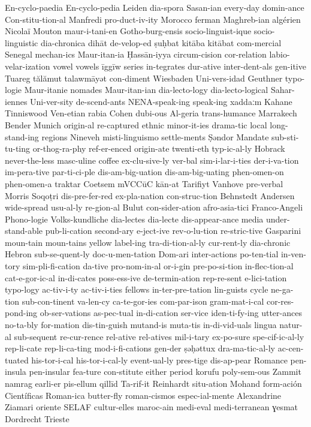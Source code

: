 {En-cyclo-paedia
En-cyclo-pedia
Leiden
dia-spora
Sasan-ian
every-day
domin-ance
Con-stitu-tion-al
Manfredi
pro-duct-iv-ity
Morocco
ferman
Maghreb-ian
algérien
Nicolaï
Mouton
maur-i-tani-en
Gotho-burg-ensis
socio-linguist-ique
socio-linguistic
dia-chronica
dihāt
de-velop-ed
ṣuḥbat
kitāba
kitābat
com-mercial
Senegal
mechan-ics
Maur-itan-ia
Ḥassān-iyya
circum-cision
cor-relation
labio-velar-ization
vowel
vowels
īggīw
series
in-tegrates
dur-ative
inter-dent-als
gen-itive
Tuareg
tălămut
talawmāyət
con-diment
Wiesbaden
Uni-vers-idad
Geuthner
typo-logie
Maur-itanie
nomades
Maur-itan-ian
dia-lecto-logy
dia-lecto-logical
Sahar-iennes
Uni-ver-sity
de-scend-ants
NENA-speak-ing
speak-ing
xaddaːm
Kahane
Tinniswood
Ven-etian
rabia
Cohen
dubi-ous
Al-geria
trans-humance
Marrakech
Bender
Munich
origin-al
re-captured
ethnic
minor-it-ies
drama-tic
local
long-stand-ing
regions
Nineveh
misti-linguismo
settle-ments
Ṣəndor
Mandate
sub-sti-tu-ting
or-thog-ra-phy
ref-er-enced
origin-ate
twenti-eth
typ-ic-al-ly
Hobrack
never-the-less
masc-uline
coffee
ex-clu-sive-ly
ver-bal
sim-i-lar-i-ties
der-i-va-tion
im-pera-tive
par-ti-ci-ple
dis-am-big-uation
dis-am-big-uating
phen-omen-on
phen-omen-a
traktar
Coetsem
mVCCūC
kān-at
Tarifiyt
Vanhove
pre-verbal
Morris
Soqoṭri
dis-pre-fer-red
ex-pla-nation
con-struc-tion
Behnstedt
Andersen
wide-spread
usu-al-ly
re-gion-al
Bulut
con-sider-ation
afro-asia-tici
Franco-Angeli
Phono-logie
Volks-kundliche
dia-lectes
dia-lecte
dis-appear-ance
media
under-stand-able
pub-li-cation
second-ary
e-ject-ive
rev-o-lu-tion
re-stric-tive
Gasparini
moun-tain
moun-tains
yellow
label-ing
tra-di-tion-al-ly
cur-rent-ly
dia-chronic
Hebron
sub-se-quent-ly
doc-u-men-tation
Dom-ari
inter-actions
po-ten-tial
in-ven-tory
sim-pli-fi-cation
da-tive
pro-nom-in-al
or-i-gin
pre-po-si-tion
in-flec-tion-al
cat-e-gor-ic-al
in-di-cates
poss-ess-ive
de-termin-ation
rep-re-sent
e-lici-tation
typo-logy
ac-tiv-i-ty
ac-tiv-i-ties
fellows
in-ter-pre-tation
lin-guists
cycle
ne-ga-tion
sub-con-tinent
va-len-cy
ca-te-gor-ies
com-par-ison
gram-mat-i-cal
cor-res-pond-ing
ob-ser-vations
as-pec-tual
in-di-cation
ser-vice
iden-ti-fy-ing
utter-ances
no-ta-bly
for-mation
dis-tin-guish
mutand-is
muta-tis
in-di-vid-uals
lingua
natur-al
sub-sequent
re-cur-rence
rel-ative
rel-atives
mil-i-tary
ex-po-sure
spe-cif-ic-al-ly
rep-li-cate
rep-li-ca-ting
mod-i-fi-cations
gen-der
ṣəḥəttux
dra-ma-tic-al-ly
ac-cen-tuated
his-tor-i-cal
his-tor-i-cal-ly
event-ual-ly
pres-tige
dis-ap-pear
Romance
pen-insula
pen-insular
fea-ture
con-stitute
either
period
korufu
poly-sem-ous
Zammit
namrag
earli-er
pis-ellum
qillīd
Ta-rif-it
Reinhardt
situ-ation
Mohand
form-ación
Científicas
Roman-ica
butter-fly
roman-cismos
espec-ial-mente
Alexandrine
Ziamari
oriente
SELAF
cultur-elles
maroc-ain
medi-eval
medi-terranean
ɣesmat
Dordrecht
Trieste
}